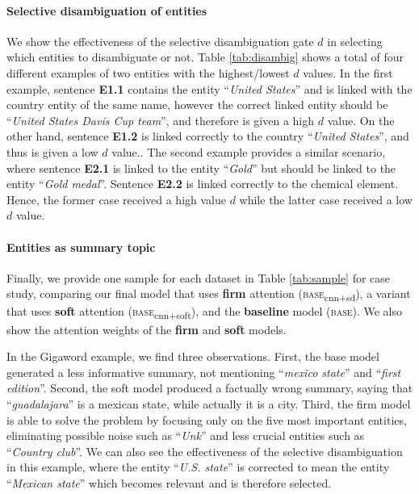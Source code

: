 \documentclass[11pt,a4paper]{article}
\begin{document}
\paragraph{Selective disambiguation of entities}

We show the effectiveness of the selective disambiguation gate $d$ in selecting which entities to disambiguate or not. Table \ref{tab:disambig} shows a total of four different examples of two entities with the highest/lowest $d$ values. In the first example, sentence \textbf{E1.1} contains the entity ``\textit{United States}'' and is linked with the country entity of the same name, however the correct linked entity should be ``\textit{United States Davis Cup team}'', and therefore is given a high $d$ value. On the other hand, sentence \textbf{E1.2} is linked correctly to the country ``\textit{United States}'', and thus is given a low $d$ value.. The second example provides a similar scenario, where sentence \textbf{E2.1} is linked to the entity ``\textit{Gold}'' but should be linked to the entity ``\textit{Gold medal}''. Sentence \textbf{E2.2} is linked correctly to the chemical element. Hence, the former case received a high value $d$ while the latter case received a low $d$ value.

\paragraph{Entities as summary topic}

Finally, we provide one sample for each dataset in Table \ref{tab:sample} for case study, comparing our final model that uses \textbf{firm} attention (\textsc{base}\textsubscript{cnn+sd}), a variant that uses \textbf{soft} attention (\textsc{base}\textsubscript{cnn+soft}), and the \textbf{baseline} model (\textsc{base}). We also show the attention weights of the \textbf{firm} and \textbf{soft} models.

In the Gigaword example, we find three observations.
First, the base model generated a less informative summary, not mentioning ``\textit{mexico state}'' and ``\textit{first edition}''.
Second, the soft model produced a factually wrong summary, saying that ``\textit{guadalajara}'' is a mexican state, while actually it is a city.
Third, the firm model is able to solve the problem by focusing only on the five most important entities, eliminating possible noise such as ``\textit{Unk}'' and less crucial entities such as ``\textit{Country club}''. We can also see the effectiveness of the selective disambiguation in this example, where the entity ``\textit{U.S. state}'' is corrected to mean the entity ``\textit{Mexican state}'' which becomes relevant and is therefore selected.
\end{document}
